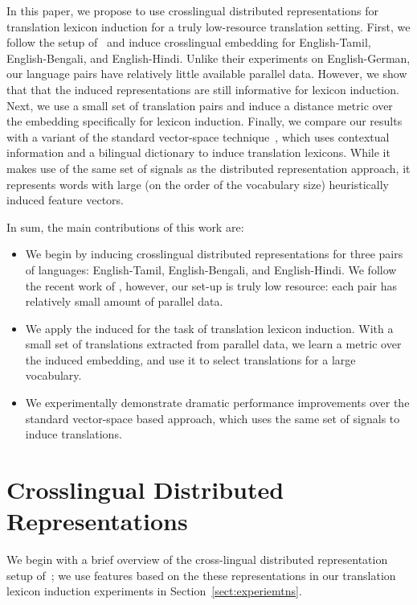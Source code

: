 \documentclass[11pt,letterpaper]{article}
\newcommand{\secref}[1]{Section~\ref{#1}}
\begin{document}
In this paper, we propose to use crosslingual distributed representations for translation lexicon induction for a truly low-resource translation setting.  First, we follow the setup of~\cite{Klementiev-et-al:COLING2012} and induce crosslingual embedding for English-Tamil, English-Bengali, and English-Hindi.  Unlike their experiments on English-German, our language pairs have relatively little available parallel data.  However, we show that that the induced representations are still informative for lexicon induction.  Next, we use a small set of translation pairs and induce a distance metric over the embedding specifically for lexicon induction.  Finally, we compare our results with a variant of the standard vector-space technique~\cite{Fung:1998}, which uses contextual information and a bilingual dictionary to induce translation lexicons.  While it makes use of the same set of signals as the distributed representation approach, it represents words with large (on the order of the vocabulary size) heuristically induced feature vectors.

In sum, the main contributions of this work are:

\begin{itemize}
  \item We begin by inducing crosslingual distributed representations for three pairs of languages: English-Tamil, English-Bengali, and English-Hindi.  We follow the recent work of \cite{Klementiev-et-al:COLING2012}, however, our set-up is truly low resource: each pair has relatively small amount of parallel data.
  \item We apply the induced for the task of translation lexicon induction.  With a small set of translations extracted from parallel data, we learn a metric over the induced embedding, and use it to select translations for a large vocabulary.
  \item We experimentally demonstrate dramatic performance improvements over the standard vector-space based approach, which uses the same set of signals to induce translations.
\end{itemize}

\section{Crosslingual Distributed Representations} \label{sect:background}

We begin with a brief overview of the cross-lingual distributed representation setup of~\cite{Klementiev-et-al:COLING2012}; we use features based on the these representations in our translation lexicon induction experiments in \secref{sect:experiemtns}. 
\end{document}

